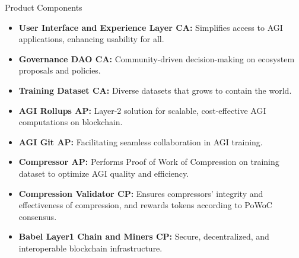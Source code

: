 \documentclass{beamer}
\begin{document}
\begin{frame}{Product Components}
    \begin{itemize}
        \item \textbf{User Interface and Experience Layer \textbar CA:} Simplifies access to AGI applications, enhancing usability for all.
        \item \textbf{Governance DAO \textbar CA:} Community-driven decision-making on ecosystem proposals and policies.
        \item \textbf{Training Dataset \textbar CA:} Diverse datasets that grows to contain the world.
        \item \textbf{AGI Rollups \textbar AP: } Layer-2 solution for scalable, cost-effective AGI computations on blockchain.
        \item \textbf{AGI Git \textbar AP:} Facilitating seamless collaboration in AGI training.
        \item \textbf{Compressor \textbar AP:} Performs Proof of Work of Compression on training dataset to optimize AGI quality and efficiency.
        \item \textbf{Compression Validator \textbar CP:} Ensures compressors' integrity and effectiveness of compression, and rewards tokens according to PoWoC consensus. 
        \item \textbf{Babel Layer1 Chain and Miners \textbar CP:} Secure, decentralized, and interoperable blockchain infrastructure.
    \end{itemize}
\end{frame}
\end{document}
